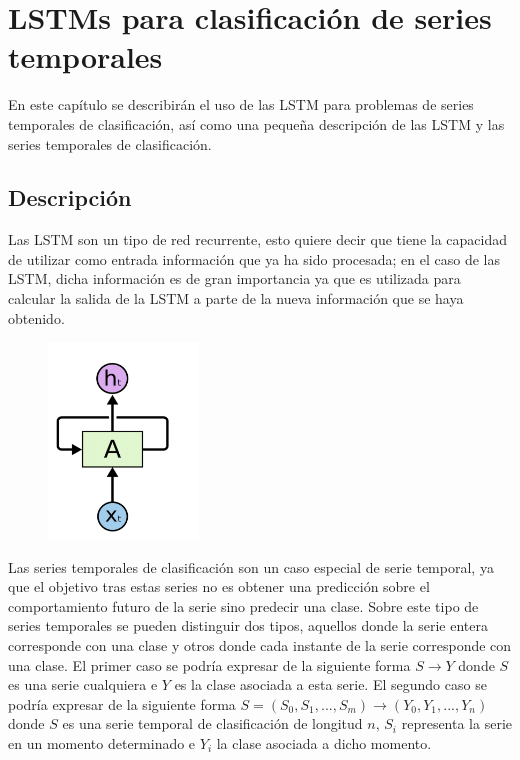 \chapter{LSTMs para clasificación de series temporales}
En este capítulo se describirán el uso de las LSTM para problemas de series temporales de clasificación, así como una pequeña descripción de las LSTM y las series temporales de clasificación.
\section{Descripción}
Las LSTM son un tipo de red recurrente, esto quiere decir que tiene la capacidad de utilizar como entrada información que ya ha sido procesada; en el caso de las LSTM, dicha información es de gran importancia ya que es utilizada para calcular la salida de la LSTM a parte de la nueva información que se haya obtenido.\newline

\begin{figure}[h]
	\centering
	\includegraphics[width=40mm]{imagenes/lstm_basico.png}
	\label{fig:31}
\end{figure}
\verticalspace

Las series temporales de clasificación son un caso especial de serie temporal, ya que el objetivo tras estas series no es obtener una predicción sobre el comportamiento futuro de la serie sino predecir una clase. Sobre este tipo de series temporales se pueden distinguir dos tipos, aquellos donde la serie entera corresponde con una clase y otros donde cada instante de la serie corresponde con una clase. El primer caso se podría expresar de la siguiente forma $ S \rightarrow Y $ donde $S$  es una serie cualquiera e $Y$ es la clase asociada a esta serie. El segundo caso se podría expresar de la siguiente forma $ S = (S_0, S_1,..., S_m) \rightarrow (Y_0,Y_1,..., Y_n) $ donde $S$ es una serie temporal de clasificación de longitud $n$, $S_i$ representa la serie en un momento determinado e $Y_i$ la clase asociada a dicho momento.\newline

